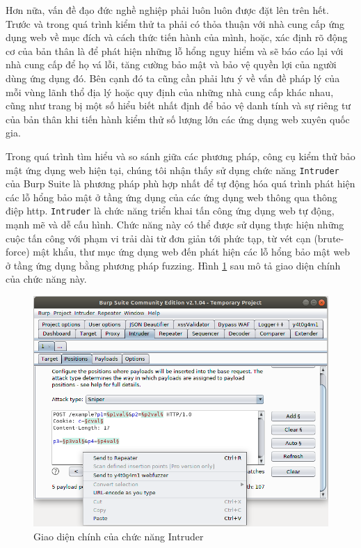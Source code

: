 Hơn nữa, vấn đề đạo đức nghề nghiệp phải luôn luôn được đặt lên trên hết. Trước và trong quá trình kiểm thử ta phải có thỏa thuận với nhà cung cấp ứng dụng web về mục đích và cách thức tiến hành của mình, hoặc, xác định rõ động cơ của bản thân là để phát hiện những lỗ hổng nguy hiểm và sẽ báo cáo lại với nhà cung cấp để họ vá lỗi, tăng cường bảo mật và bảo vệ quyền lợi của người dùng ứng dụng đó. Bên cạnh đó ta cũng cần phải lưu ý về vấn đề pháp lý của mỗi vùng lãnh thổ địa lý hoặc quy định của những nhà cung cấp khác nhau, cũng như trang bị một số hiểu biết nhất định để bảo vệ danh tính và sự riêng tư của bản thân khi tiến hành kiểm thử số lượng lớn các ứng dụng web xuyên quốc gia.\par
Trong quá trình tìm hiểu và so sánh giữa các phương pháp, công cụ kiểm thử bảo mật ứng dụng web hiện tại, chúng tôi nhận thấy sử dụng chức năng \texttt{Intruder} của Burp Suite là phương pháp phù hợp nhất để tự động hóa quá trình phát hiện các lỗ hổng bảo mật ở tầng ứng dụng của các ứng dụng web thông qua thông điệp \acrshort{http}. \texttt{Intruder} là chức năng triển khai tấn công ứng dụng web tự động, mạnh mẽ và dễ cấu hình. Chức năng này có thể được sử dụng thực hiện những cuộc tấn công với phạm vi trải dài từ đơn giản tới phức tạp, từ vét cạn (brute-force) mật khẩu, thư mục ứng dụng web đến phát hiện các lỗ hổng bảo mật web ở tầng ứng dụng bằng phương pháp fuzzing. Hình \ref{fig:send-base-request-1} sau mô tả giao diện chính của chức năng này.
\begin{figure}[H]
    \centering
        \includegraphics[width=\textwidth,keepaspectratio=true]{images/send-base-request.png}
    \caption{Giao diện chính của chức năng Intruder}
    \label{fig:send-base-request-1}
\end{figure}
